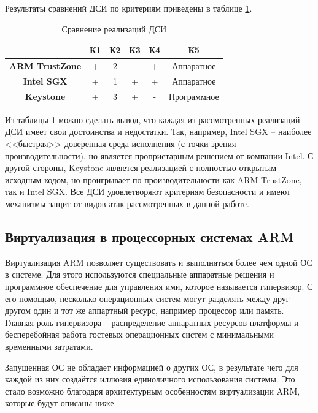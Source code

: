 Результаты сравнений ДСИ по критериям приведены в таблице \ref{table:comparsion}.

\begin{table}[!htb]
	\begin{center}
		\caption{Сравнение реализаций ДСИ}
		\label{table:comparsion}
		\begin{tabular}{|c|c|c|c|c|c|}
			\hline
			 & \bfseries К1 & \bfseries К2 & \bfseries К3 & \bfseries К4 & \bfseries К5 \\
			\hline
			\bfseries ARM TrustZone & + & 2 & - & + & Аппаратное \\ \hline
			\bfseries Intel SGX & + & 1 & + & + & Аппаратное\\ \hline
			\bfseries Keystone & + & 3 & + & - & Программное\\ \hline
		\end{tabular}
	\end{center}
\end{table}

Из таблицы \ref{table:comparsion} можно сделать вывод, что каждая из рассмотренных реализаций ДСИ имеет свои достоинства и недостатки. Так, например, Intel SGX -- наиболее <<быстрая>> доверенная среда исполнения (с точки зрения производительности), но является проприетарным решением от компании Intel. С другой стороны, Keystone является реализацией с полностью открытым исходным кодом, но проигрывает по производительности как ARM TrustZone, так и Intel SGX. Все ДСИ удовлетворяют критериям безопасности и имеют механизмы защит от видов атак рассмотренных в данной работе.

\subsection{Виртуализация в процессорных системах ARM}

Виртуализация ARM позволяет существовать и выполняться более чем одной ОС в системе. Для этого используются специальные аппаратные решения и программное обеспечение для управления ими, которое называется гипервизор. С его помощью, несколько операционных систем могут разделять между друг другом один и тот же аппартный ресурс, например процессор или память. Главная роль гипервизора -- распределение аппаратных ресурсов платформы и бесперебойная работа гостевых операционных систем с минимальными временными затратами.

Запущенная ОС не обладает информацией о других ОС, в результате чего для каждой из них создаётся иллюзия единоличного использования системы. Это стало возможно благодаря архитектурным особенностям виртуализации ARM, которые будут описаны ниже.

